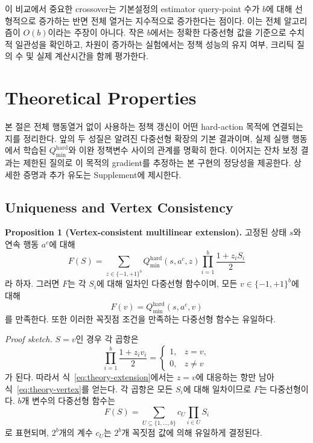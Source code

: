 \documentclass[10pt,journal]{IEEEtran}
\begin{document}
이 비교에서 중요한 crossover는 기본설정의 estimator query-point 수가 $b$에 대해 선형적으로 증가하는 반면 전체 열거는 지수적으로 증가한다는 점이다. 이는 전체 알고리즘이 $O(b)$이라는 주장이 아니다. 작은 $b$에서는 정확한 다중선형 값을 기준으로 수치적 일관성을 확인하고, 차원이 증가하는 실험에서는 정책 성능의 유지 여부, 크리틱 질의 수 및 실제 계산시간을 함께 평가한다.
\section{Theoretical Properties}
\label{sec:theoretical-properties}

본 절은 전체 행동열거 없이 사용하는 정책 갱신이 어떤 hard-action 목적에 연결되는지를 정리한다. 앞의 두 성질은 알려진 다중선형 확장의 기본 결과이며, 실제 실행 행동에서 학습된 $Q_{\min}^{\mathrm{hard}}$와 이완 정책변수 사이의 관계를 명확히 한다. 이어지는 잔차 보정 결과는 제한된 질의로 이 목적의 gradient를 추정하는 본 구현의 정당성을 제공한다. 상세한 증명과 추가 유도는 Supplement에 제시한다.


\subsection{Uniqueness and Vertex Consistency}

\noindent\textbf{Proposition 1 (Vertex-consistent multilinear extension).}
고정된 상태 $s$와 연속 행동 $a^c$에 대해
\begin{equation}
F(S)
=
\sum_{z\in\{-1,+1\}^b}
Q_{\min}^{\mathrm{hard}}(s,a^c,z)
\prod_{i=1}^{b}\frac{1+z_iS_i}{2}
\label{eq:theory-extension}
\end{equation}
라 하자. 그러면 $F$는 각 $S_i$에 대해 일차인 다중선형 함수이며, 모든
$v\in\{-1,+1\}^b$에 대해
\begin{equation}
F(v)=Q_{\min}^{\mathrm{hard}}(s,a^c,v)
\label{eq:theory-vertex}
\end{equation}
를 만족한다. 또한 이러한 꼭짓점 조건을 만족하는 다중선형 함수는 유일하다.

\noindent\emph{Proof sketch.}
$S=v$인 경우 각 곱항은
\begin{equation}
\prod_{i=1}^{b}\frac{1+z_iv_i}{2}
=
\begin{cases}
1, & z=v,\\
0, & z\neq v
\end{cases}
\end{equation}
가 된다. 따라서 식~\eqref{eq:theory-extension}에서는 $z=v$에 대응하는 항만 남아 식~\eqref{eq:theory-vertex}를 얻는다. 각 곱항은 모든 $S_i$에 대해 일차이므로 $F$는 다중선형이다. $b$개 변수의 다중선형 함수는
\begin{equation}
F(S)=\sum_{U\subseteq\{1,\ldots,b\}}c_U\prod_{i\in U}S_i
\end{equation}
로 표현되며, $2^b$개의 계수 $c_U$는 $2^b$개 꼭짓점 값에 의해 유일하게 결정된다.
\end{document}
